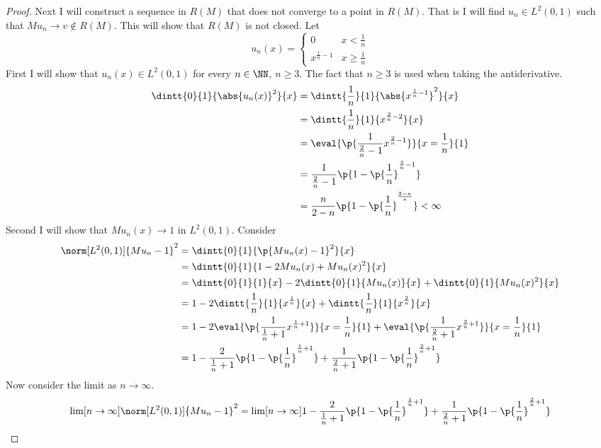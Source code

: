 \documentclass[11pt, oneside]{article}
\begin{document}
\begin{enumerate}
\begin{proof}
      Next I will construct a sequence in $R(M)$ that does not converge
      to a point in $R(M)$.
      That is I will find $u_n \in L^2(0,1)$ such that $Mu_n \to v \not\in R(M)$.
      This will show that $R(M)$ is not closed.
      Let
      \[
        u_n(x) =
        \begin{cases}
          0 & x < \frac{1}{n} \\
          x^{\frac{1}{n} - 1} & x \ge \frac{1}{n}
        \end{cases}
      \]
      First I will show that $u_n(x) \in L^2(0, 1)$ for every $n \in \NN$, $n \ge 3$.
      The fact that $n \ge 3$ is used when taking the antiderivative.
      \begin{align*}
        \dintt{0}{1}{\abs{u_n(x)}^2}{x} &= \dintt{\frac{1}{n}}{1}{\abs{x^{\frac{1}{n} - 1}}^2}{x} \\
        &= \dintt{\frac{1}{n}}{1}{x^{\frac{2}{n} - 2}}{x} \\
        &= \eval{\p{\frac{1}{\frac{2}{n} - 1} x^{\frac{2}{n} - 1}}}{x = \frac{1}{n}}{1} \\
        &= \frac{1}{\frac{2}{n} - 1}\p{1 - \p{\frac{1}{n}}^{\frac{2}{n} - 1}} \\
        &= \frac{n}{2 - n}\p{1 - \p{\frac{1}{n}}^{\frac{2 - n}{n}}} < \infty
      \end{align*}
      Second I will show that $Mu_n(x) \to 1$ in $L^2(0, 1)$.
      Consider
      \begin{align*}
        \norm[L^2(0, 1)]{Mu_n - 1}^2 &= \dintt{0}{1}{\p{Mu_n(x) - 1}^2}{x} \\
        &= \dintt{0}{1}{1 - 2Mu_n(x) + Mu_n(x)^2}{x} \\
        &= \dintt{0}{1}{1}{x} - 2\dintt{0}{1}{Mu_n(x)}{x} + \dintt{0}{1}{Mu_n(x)^2}{x} \\
        &= 1 - 2\dintt{\frac{1}{n}}{1}{x^{\frac{1}{n}}}{x} + \dintt{\frac{1}{n}}{1}{x^{\frac{2}{n}}}{x} \\
        &= 1 - 2\eval{\p{\frac{1}{\frac{1}{n} + 1} x^{\frac{1}{n} + 1}}}{x = \frac{1}{n}}{1} + \eval{\p{\frac{1}{\frac{2}{n} + 1}x^{\frac{2}{n} + 1}}}{x = \frac{1}{n}}{1} \\
        &= 1 - \frac{2}{\frac{1}{n} + 1}\p{1 - \p{\frac{1}{n}}^{\frac{1}{n} + 1}} + \frac{1}{\frac{2}{n} + 1}\p{1 - \p{\frac{1}{n}}^{\frac{2}{n} + 1}}\\
      \end{align*}
      Now consider the limit as $n \to \infty$.
      \begin{align*}
        \lim[n \to \infty]{\norm[L^2(0, 1)]{Mu_n - 1}^2} &= \lim[n \to \infty]{1 - \frac{2}{\frac{1}{n} + 1}\p{1 - \p{\frac{1}{n}}^{\frac{1}{n} + 1}} + \frac{1}{\frac{2}{n} + 1}\p{1 - \p{\frac{1}{n}}^{\frac{2}{n} + 1}}} \\

\end{align*}
\end{proof}
\end{enumerate}
\end{document}
